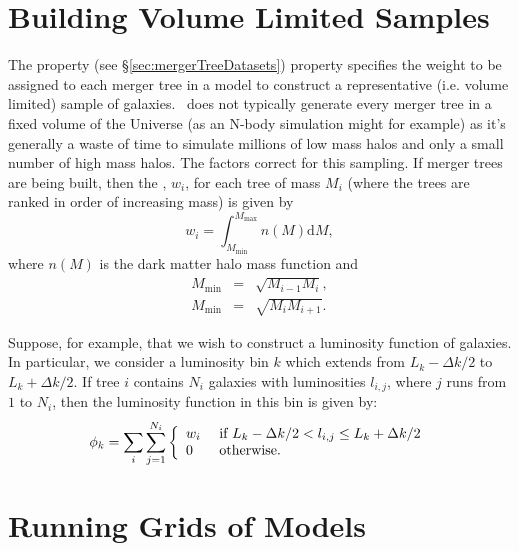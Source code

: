 \section{Building Volume Limited Samples}\label{sec:volumeLimitedSamples}

The  property (see \S\ref{sec:mergerTreeDatasets}) property specifies the weight to be assigned to each merger tree in a model to construct a representative (i.e. volume limited) sample of galaxies. \glc\ does not typically generate every merger tree in a fixed volume of the Universe (as an N-body simulation might for example) as it's generally a waste of time to simulate millions of low mass halos and only a small number of high mass halos. The  factors correct for this sampling. If merger trees are being built, then the , $w_i$, for each tree of mass $M_i$ (where the trees are ranked in order of increasing mass) is given by
\begin{equation}
 w_i = \int_{M_\mathrm{min}}^{M_\mathrm{max}} n(M) \mathrm{d}M,
\end{equation}
where $n(M)$ is the dark matter halo mass function and
\begin{eqnarray}
 M_\mathrm{min} &=& \sqrt{M_{i-1}M_i}, \\
 M_\mathrm{min} &=& \sqrt{M_i M_{i+1}}.
\end{eqnarray}

Suppose, for example, that we wish to construct a luminosity function of galaxies. In particular, we consider a luminosity bin $k$ which extends from $L_k-\Delta k/2$ to $L_k+\Delta k/2$. If tree $i$ contains $N_i$ galaxies with luminosities $l_{i,j}$, where $j$ runs from $1$ to $N_i$, then the luminosity function in this bin is given by:
\begin{equation}
 \phi_k = \sum_i \sum_{j=1}^{N_i} \left\{ \begin{array}{ll} w_i & \hbox{ if  } L_k-\Delta k/2 < l_{i,j} \le L_k+\Delta k/2 \\ 0 & \hbox{ otherwise.} \end{array} \right.
\end{equation}

\section{Running Grids of Models}\label{sec:RunningGrids}

